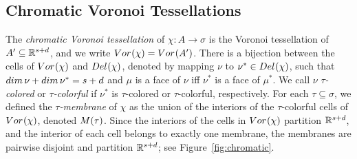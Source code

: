 \documentclass[a4paper]{article}
\newcommand {\mm}[1]   {\ifmmode{#1}\else{\mbox{\(#1\)}}\fi}
\newcommand{\Rspace}        {\mm{{\mathbb R}}}
\newcommand{\Voronoi}[2]    {\mm{{\rm Vor}_{#1}{({#2})}}}
\newcommand{\Delaunay}[2]   {\mm{{\rm Del}_{#1}{({#2})}}}
\newcommand{\Membrane}[1]   {\mm{M{({#1})}}}
\newcommand{\dime}[1]       {\mm{\rm dim\,}{#1}}
\theoremstyle{definition}
\numberwithin{theorem}{section}
\numberwithin{equation}{section}
\begin{document}
\subsection{Chromatic Voronoi Tessellations}
\label{sec:3.2}

The \emph{chromatic Voronoi tessellation} of $\chi \colon A \to \sigma$ is the Voronoi tessellation of $A' \subseteq \Rspace^{s+d}$, and we write $\Voronoi{}{\chi} = \Voronoi{}{A'}$.
There is a bijection between the cells of $\Voronoi{}{\chi}$ and $\Delaunay{}{\chi}$, denoted by mapping $\nu$ to $\nu^* \in \Delaunay{}{\chi}$, such that $\dime{\nu} + \dime{\nu^*} = s+d$ and $\mu$ is a face of $\nu$ iff $\nu^*$ is a face of $\mu^*$.
We call $\nu$ \emph{$\tau$-colored} or \emph{$\tau$-colorful} if $\nu^*$ is $\tau$-colored or $\tau$-colorful, respectively.
For each $\tau \subseteq \sigma$, we defined the \emph{$\tau$-membrane} of $\chi$ as the union of the interiors of the $\tau$-colorful cells of $\Voronoi{}{\chi}$, denoted $\Membrane{\tau}$.
Since the interiors of the cells in $\Voronoi{}{\chi}$ partition $\Rspace^{s+d}$, and the interior of each cell belongs to exactly one membrane, the membranes are pairwise disjoint and partition $\Rspace^{s+d}$; see Figure~\ref{fig:chromatic}.
\end{document}
